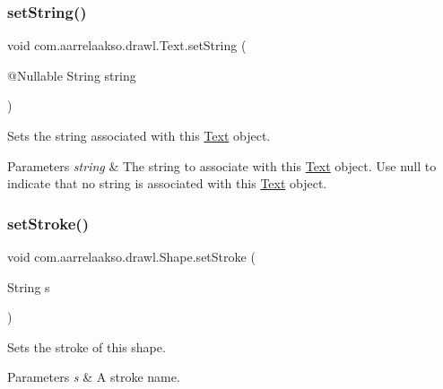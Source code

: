 \subsubsection{\texorpdfstring{set\+String()}{setString()}}
{\footnotesize\ttfamily void com.\+aarrelaakso.\+drawl.\+Text.\+set\+String (\begin{DoxyParamCaption}\item[{@Nullable String}]{string }\end{DoxyParamCaption})}



Sets the string associated with this \hyperlink{classcom_1_1aarrelaakso_1_1drawl_1_1_text}{Text} object. 


\begin{DoxyParams}{Parameters}
{\em string} & The string to associate with this \hyperlink{classcom_1_1aarrelaakso_1_1drawl_1_1_text}{Text} object. Use {\ttfamily null} to indicate that no string is associated with this \hyperlink{classcom_1_1aarrelaakso_1_1drawl_1_1_text}{Text} object. \\
\hline
\end{DoxyParams}
\mbox{\label{classcom_1_1aarrelaakso_1_1drawl_1_1_shape_a3930f6fe72f6c5e0c0aa4c25ffbf18ff}} 
\subsubsection{\texorpdfstring{set\+Stroke()}{setStroke()}}
{\footnotesize\ttfamily void com.\+aarrelaakso.\+drawl.\+Shape.\+set\+Stroke (\begin{DoxyParamCaption}\item[{String}]{s }\end{DoxyParamCaption})\hspace{0.3cm}{\ttfamily [inherited]}}



Sets the stroke of this shape. 


\begin{DoxyParams}{Parameters}
{\em s} & A stroke name. \\
\hline
\end{DoxyParams}
\mbox{\label{classcom_1_1aarrelaakso_1_1drawl_1_1_text_aaded65428b035e05b91e65f21808b434}} 
